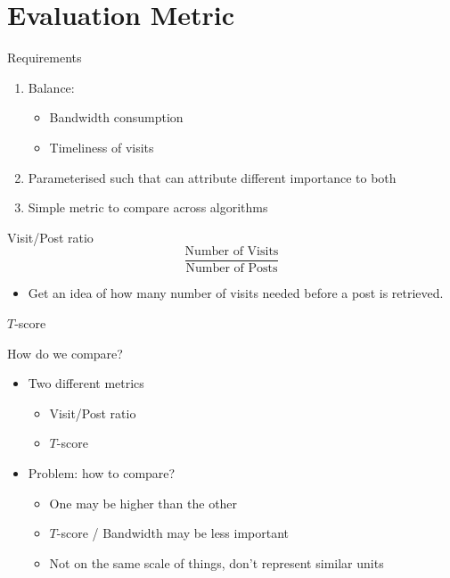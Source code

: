 \documentclass[12pt]{../presentation}
\begin{document}
\section{Evaluation Metric}
	\begin{frame}{Requirements}
		\begin{enumerate}
			\item Balance:
				\begin{itemize}
				\item Bandwidth consumption
				\item Timeliness of visits
				\end{itemize}
			\item Parameterised such that can attribute different importance to 
both
			\item Simple metric to compare across algorithms
		\end{enumerate}
	\end{frame}
	\begin{frame}{Visit/Post ratio}
				\[ \frac{\text{Number of Visits}}{\text{Number of Posts}} \]
		\begin{itemize}
			\item Get an idea of how many number of visits needed before a post 
				is retrieved.
		\end{itemize}
	\end{frame}
	\begin{frame}{$T$-score}
	\begin{center}
		
	\end{center}
	\end{frame}
	\begin{frame}{How do we compare?}
		\begin{itemize}
			\item Two different metrics
				\begin{itemize}
					\item Visit/Post ratio
					\item $T$-score
				\end{itemize}
			\item Problem: how to compare?
				\begin{itemize}
					\item One may be higher than the other
					\item $T$-score / Bandwidth may be less important
					\item Not on the same scale of things, don't represent 
						similar units
				\end{itemize}
		\end{itemize}
	\end{frame}
\end{document}
